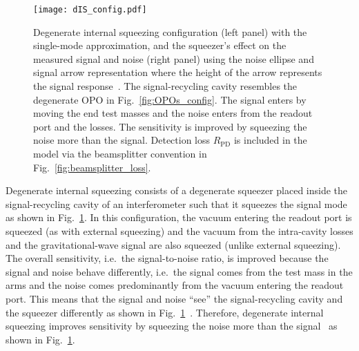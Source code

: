 \begin{figure}[ht]
	\centering
	\texttt{[image: dIS\_config.pdf]}
	\caption{ Degenerate internal squeezing configuration (left panel) with the single-mode approximation, and the squeezer's effect on the measured signal and noise (right panel) using the noise ellipse and signal arrow representation where the height of the arrow represents the signal response~\cite{}. The signal-recycling cavity resembles the degenerate OPO in Fig.~\ref{fig:OPOs_config}. The signal enters by moving the end test masses and the noise enters from the readout port and the losses. The sensitivity is improved by squeezing the noise more than the signal. Detection loss $R_\text{PD}$ is included in the model via the beamsplitter convention in Fig.~\ref{fig:beamsplitter_loss}.}
	\label{fig:dIS_config}
\end{figure}

Degenerate internal squeezing consists of a degenerate squeezer placed inside the signal-recycling cavity of an interferometer such that it squeezes the signal mode~\cite{} as shown in Fig.~\ref{fig:dIS_config}. In this configuration, the vacuum entering the readout port is squeezed (as with external squeezing) and the vacuum from the intra-cavity losses and the gravitational-wave signal are also squeezed (unlike external squeezing).
The overall sensitivity, i.e.\ the signal-to-noise ratio, is improved because the signal and noise behave differently, i.e.\ the signal comes from the test mass in the arms and the noise comes predominantly from the vacuum entering the readout port. This means that the signal and noise ``see'' the signal-recycling cavity and the squeezer differently as shown in Fig.~\ref{fig:dIS_config}~\cite{}. %
Therefore, degenerate internal squeezing improves sensitivity by squeezing the noise more than the signal~\cite{} as shown in Fig.~\ref{fig:dIS_config}.


